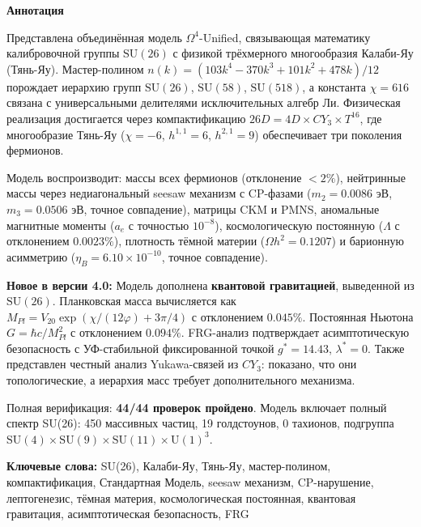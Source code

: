 \documentclass[12pt,a4paper,twoside]{article}
\newcommand{\SU}{\mathrm{SU}}
\newcommand{\Uone}{\mathrm{U}(1)}
\theoremstyle{definition}
\newenvironment{abstractbox}{%
  \begin{tcolorbox}[
    enhanced,
    colback=lightgray,
    colframe=deepblue,
    boxrule=0.8pt,
    arc=4pt,
    left=10pt, right=10pt, top=8pt, bottom=8pt,
    breakable
  ]
  \small
}{%
  \end{tcolorbox}
}
\begin{document}
\begin{abstractbox}
\begin{center}
{\Large\bfseries\color{deepblue} Аннотация}
\end{center}
\vspace{0.3em}

Представлена объединённая модель $\Omega^4$-Unified, связывающая математику калибровочной группы $\SU(26)$ с физикой трёхмерного многообразия Калаби-Яу (Тянь-Яу). Мастер-полином $n(k) = (103k^4 - 370k^3 + 101k^2 + 478k)/12$ порождает иерархию групп $\SU(26)$, $\SU(58)$, $\SU(518)$, а константа $\chi = 616$ связана с универсальными делителями исключительных алгебр Ли. Физическая реализация достигается через компактификацию $26D = 4D \times CY_3 \times T^{16}$, где многообразие Тянь-Яу ($\chi = -6$, $h^{1,1} = 6$, $h^{2,1} = 9$) обеспечивает три поколения фермионов.

Модель воспроизводит: массы всех фермионов (отклонение $< 2\%$), нейтринные массы через недиагональный seesaw механизм с CP-фазами ($m_2 = 0.0086$ эВ, $m_3 = 0.0506$ эВ, точное совпадение), матрицы CKM и PMNS, аномальные магнитные моменты ($a_e$ с точностью $10^{-8}$), космологическую постоянную ($\Lambda$ с отклонением $0.0023\%$), плотность тёмной материи ($\Omega h^2 = 0.1207$) и барионную асимметрию ($\eta_B = 6.10 \times 10^{-10}$, точное совпадение).

\textbf{Новое в версии 4.0:} Модель дополнена \textbf{квантовой гравитацией}, выведенной из $\SU(26)$. Планковская масса вычисляется как $M_{Pl} = V_{20} \exp(\chi/(12\varphi) + 3\pi/4)$ с отклонением $0.045\%$. Постоянная Ньютона $G = \hbar c / M_{Pl}^2$ с отклонением $0.094\%$. FRG-анализ подтверждает асимптотическую безопасность с УФ-стабильной фиксированной точкой $g^* = 14.43$, $\lambda^* = 0$. Также представлен честный анализ Yukawa-связей из $CY_3$: показано, что они топологические, а иерархия масс требует дополнительного механизма.

Полная верификация: \textbf{44/44 проверок пройдено}. Модель включает полный спектр SU(26): 450 массивных частиц, 19 голдстоунов, 0 тахионов, подгруппа $\SU(4) \times \SU(9) \times \SU(11) \times \Uone^3$.

\vspace{0.3em}
\textbf{Ключевые слова:} SU(26), Калаби-Яу, Тянь-Яу, мастер-полином, компактификация, Стандартная Модель, seesaw механизм, CP-нарушение, лептогенезис, тёмная материя, космологическая постоянная, квантовая гравитация, асимптотическая безопасность, FRG
\end{abstractbox}
\end{document}
